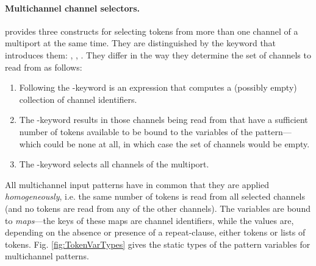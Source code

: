 \paragraph{Multichannel channel selectors.} \Cal provides three
constructs for
selecting tokens from more than one channel of a multiport at the same
time. They are distinguished by the keyword that introduces them:
\kwAtN, \kwAny, \kwAll. They differ in the way they determine the set
of channels to read from as follows:
\begin{enumerate}
\item Following the \kwAtN-keyword is an expression that computes a
  (possibly empty) collection of channel identifiers.
\item The \kwAny-keyword results in those channels being read from
  that have a sufficient number of tokens available to be bound to the
  variables of the pattern---which could be none at all, in which case
  the set of channels would be empty.
\item The \kwAll-keyword selects all channels of the multiport.
\end{enumerate}


All multichannel input patterns have in common that they are applied
{\em homogeneously}, i.e. the same number of tokens is read from all
selected channels (and no tokens are read from any of the other
channels). The variables are bound to {\em maps}---the keys of these
maps are channel identifiers, while the values are, depending on the
absence or presence of a repeat-clause, either tokens or lists of
tokens. Fig. \ref{fig:TokenVarTypes} gives the static types of the
pattern variables for multichannel patterns.

